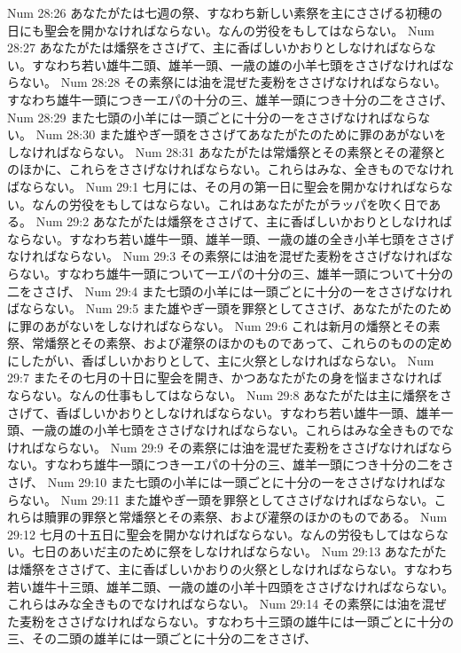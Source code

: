 Num 28:26  あなたがたは七週の祭、すなわち新しい素祭を主にささげる初穂の日にも聖会を開かなければならない。なんの労役をもしてはならない。
Num 28:27  あなたがたは燔祭をささげて、主に香ばしいかおりとしなければならない。すなわち若い雄牛二頭、雄羊一頭、一歳の雄の小羊七頭をささげなければならない。
Num 28:28  その素祭には油を混ぜた麦粉をささげなければならない。すなわち雄牛一頭につき一エパの十分の三、雄羊一頭につき十分の二をささげ、
Num 28:29  また七頭の小羊には一頭ごとに十分の一をささげなければならない。
Num 28:30  また雄やぎ一頭をささげてあなたがたのために罪のあがないをしなければならない。
Num 28:31  あなたがたは常燔祭とその素祭とその灌祭とのほかに、これらをささげなければならない。これらはみな、全きものでなければならない。
Num 29:1  七月には、その月の第一日に聖会を開かなければならない。なんの労役をもしてはならない。これはあなたがたがラッパを吹く日である。
Num 29:2  あなたがたは燔祭をささげて、主に香ばしいかおりとしなければならない。すなわち若い雄牛一頭、雄羊一頭、一歳の雄の全き小羊七頭をささげなければならない。
Num 29:3  その素祭には油を混ぜた麦粉をささげなければならない。すなわち雄牛一頭について一エパの十分の三、雄羊一頭について十分の二をささげ、
Num 29:4  また七頭の小羊には一頭ごとに十分の一をささげなければならない。
Num 29:5  また雄やぎ一頭を罪祭としてささげ、あなたがたのために罪のあがないをしなければならない。
Num 29:6  これは新月の燔祭とその素祭、常燔祭とその素祭、および灌祭のほかのものであって、これらのものの定めにしたがい、香ばしいかおりとして、主に火祭としなければならない。
Num 29:7  またその七月の十日に聖会を開き、かつあなたがたの身を悩まさなければならない。なんの仕事もしてはならない。
Num 29:8  あなたがたは主に燔祭をささげて、香ばしいかおりとしなければならない。すなわち若い雄牛一頭、雄羊一頭、一歳の雄の小羊七頭をささげなければならない。これらはみな全きものでなければならない。
Num 29:9  その素祭には油を混ぜた麦粉をささげなければならない。すなわち雄牛一頭につき一エパの十分の三、雄羊一頭につき十分の二をささげ、
Num 29:10  また七頭の小羊には一頭ごとに十分の一をささげなければならない。
Num 29:11  また雄やぎ一頭を罪祭としてささげなければならない。これらは贖罪の罪祭と常燔祭とその素祭、および灌祭のほかのものである。
Num 29:12  七月の十五日に聖会を開かなければならない。なんの労役もしてはならない。七日のあいだ主のために祭をしなければならない。
Num 29:13  あなたがたは燔祭をささげて、主に香ばしいかおりの火祭としなければならない。すなわち若い雄牛十三頭、雄羊二頭、一歳の雄の小羊十四頭をささげなければならない。これらはみな全きものでなければならない。
Num 29:14  その素祭には油を混ぜた麦粉をささげなければならない。すなわち十三頭の雄牛には一頭ごとに十分の三、その二頭の雄羊には一頭ごとに十分の二をささげ、
